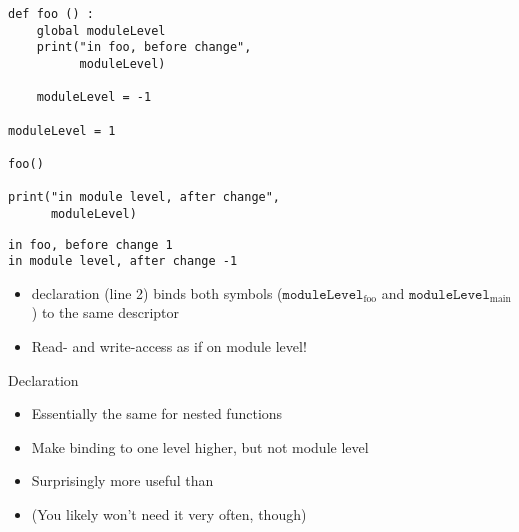 
\begin{frame}[fragile]
%
\begin{tcbraster}[raster columns=2,
                  raster equal height,
                  nobeforeafter,
                  raster column skip=0.5cm]
\begin{codebox}
\begin{verbatim}
def foo () :
    global moduleLevel
    print("in foo, before change",
          moduleLevel)
    
    moduleLevel = -1

moduleLevel = 1

foo()

print("in module level, after change",
      moduleLevel)
\end{verbatim}
\end{codebox}
%
\begin{cmdbox}
\begin{verbatim}
in foo, before change 1
in module level, after change -1
\end{verbatim}
\end{cmdbox}
\end{tcbraster}
%
\begin{itemize}
\item {} declaration (line 2) binds both symbols ($\texttt{moduleLevel}_{\text{foo}}$ and $\texttt{moduleLevel}_{\text{main}}$) to the same descriptor
\item Read- and write-access as if on module level!
\end{itemize}
%
\end{frame}


\begin{frame}[fragile]{ Declaration}
%
\begin{itemize}
\item Essentially the same for nested functions
\item Make binding to one level higher, but not module level
\item Surprisingly more useful than 
\item (You likely won't need it very often, though)
\end{itemize}
%
\end{frame}

